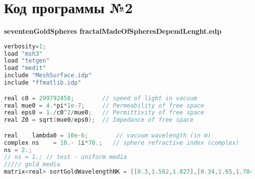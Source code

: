 \chapter{Код программы №2}
\begin{center}
	\textbf{seventenGoldSpheres fractalMadeOfSpheresDependLenght.edp}
\end{center}
\begin{lstlisting}[language=C]
verbosity=1;
load "msh3"
load "tetgen"
load "medit"
include "MeshSurface.idp"
include "ffmatlib.idp"

real c0 = 299792458;        // speed of light in vacuum
real mue0 = 4.*pi*1e-7;     // Permeability of free space
real eps0 = 1./c0^2/mue0;   // Permittivity of free space
real Z0 = sqrt(mue0/eps0);  // Impedance of free space

real    lambda0 = 10e-6;        // vacuum wavelength (in m)
complex ns    = 10.- 1i*70.;   // sphere refractive index (complex)
ns = 2.;
// ns = 1.; // test - uniform media
///// gold media
matrix<real> sortGoldWavelengthNK = [[0.3,1.562,1.827],[0.34,1.65,1.784],[0.38,1.55,1.832],[0.42,1.533,1.85],[0.46,1.399,1.774],[0.5,0.8181,1.745],[0.54,0.3897,2.298],[0.58,0.2553,2.803],[0.62,0.1916,3.237],[0.66,0.157,3.632],[0.7,0.138,4.002],[0.74,0.1282,4.354],[0.78,0.1243,4.694],[0.82,0.1241,5.023],[0.86,0.1266,5.345],[0.9,0.1309,5.66],[0.94,0.1367,5.97],[0.98,0.1435,6.276],[1.02,0.1511,6.579],[1.06,0.1594,6.878],[1.1,0.1683,7.175],[1.14,0.1776,7.47],[1.18,0.1874,7.762],[1.22,0.1975,8.053],[1.26,0.2079,8.342],[1.3,0.2187,8.63],[1.34,0.2297,8.916],[1.45,0.2611,9.698],[1.49,0.2747,9.952],[1.53,0.2891,10.2],[1.57,0.3042,10.45],[1.61,0.3201,10.7],[1.65,0.3369,10.94],[1.69,0.3546,11.18],[1.73,0.3733,11.42],[1.77,0.3931,11.65],[1.81,0.414,11.88],[1.85,0.4361,12.11],[1.89,0.4595,12.34],[1.93,0.4842,12.57],[1.97,0.5104,12.79],[2.007,0.5345,13],[2.045,0.5544,13.25],[2.084,0.5754,13.51],[2.125,0.5977,13.78],[2.168,0.6213,14.06],[2.205,0.6421,14.3],[2.243,0.6639,14.55],[2.282,0.6869,14.8],[2.323,0.711,15.07],[2.365,0.7365,15.35],[2.409,0.7634,15.63],[2.446,0.786,15.87],[2.483,0.8096,16.11],[2.522,0.8342,16.36],[2.562,0.86,16.62],[2.603,0.8871,16.89],[2.645,0.9154,17.16],[2.689,0.9451,17.45],[2.735,0.9763,17.74],[2.782,1.009,18.04],[2.83,1.043,18.36],[2.881,1.08,18.68],[2.933,1.118,19.02],[2.987,1.158,19.36],[3.043,1.2,19.72],[3.101,1.245,20.1],[3.162,1.292,20.48],[3.224,1.342,20.88],[3.29,1.395,21.3],[3.358,1.451,21.74],[3.429,1.51,22.19],[3.503,1.573,22.66],[3.581,1.64,23.15],[3.662,1.712,23.66],[3.746,1.788,24.2],[3.835,1.869,24.75],[3.928,1.956,25.34],[4.026,2.049,25.95],[4.128,2.149,26.59],[4.236,2.256,27.26],[4.35,2.371,27.97],[4.47,2.495,28.71],[4.597,2.628,29.5],[4.731,2.773,30.32],[4.873,2.929,31.19],[5.024,3.098,32.12],[5.185,3.283,33.09],[5.356,3.483,34.13],[5.539,3.702,35.23],[5.736,3.942,36.4],[5.946,4.205,37.65],[6.173,4.494,38.99],[6.417,4.812,40.42],[6.682,5.164,41.95],[6.969,5.554,43.61],[7.282,5.987,45.39],[7.625,6.469,47.32],[8.001,7.008,49.42],[8.417,7.613,51.7],[8.878,8.292,54.2],[9.393,9.058,56.94],[9.971,9.925,59.96],[10.63,10.91,63.31],[11.37,12.02,67.05],[12.23,13.3,71.25],[13.23,14.75,76.01],[14.4,16.4,81.46],[15.81,18.29,87.78],[17.52,20.45,95.23],[19.64,22.88,104.2],[22.35,25.62,115.4]];


\end{lstlisting}
